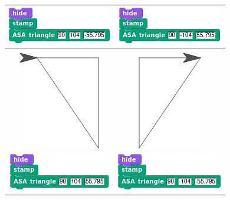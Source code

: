 \documentclass[noauthor,nooutcomes,12pt,hints,handout]{ximera}
\begin{document}
\begin{question}
\begin{freeResponse}
\begin{center}
\begin{tabular}{|c||c|}
      \includegraphics{ASAstampScriptII.png} & \includegraphics{ASAstampScriptI.png} \\
      \hline\hline
      &  \\
      \includegraphics{stampStageIII.png} & \includegraphics{stampStageIV.png} \\
      \includegraphics{ASAstampScriptIII.png} & \includegraphics{ASAstampScriptIV.png} \\\hline
    \end{tabular}
  \end{center}
  \end{freeResponse}
\end{question}
\mynewpage
\end{document}
